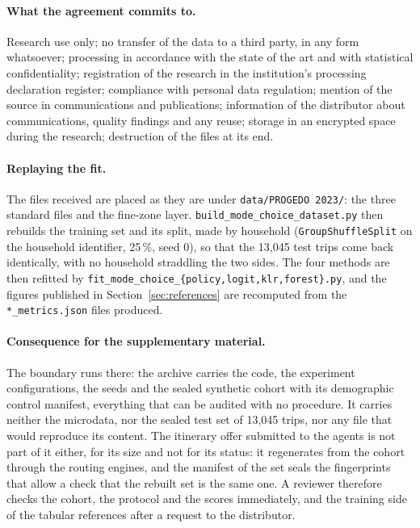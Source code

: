 \paragraph{What the agreement commits to.} Research use only; no transfer of the data to a third party, in any form whatsoever; processing in accordance with the state of the art and with statistical confidentiality; registration of the research in the institution's processing declaration register; compliance with personal data regulation; mention of the source in communications and publications; information of the distributor about communications, quality findings and any reuse; storage in an encrypted space during the research; destruction of the files at its end.

\paragraph{Replaying the fit.} The files received are placed as they are under \texttt{data/PROGEDO 2023/}: the three standard files and the fine-zone layer. \texttt{build\_mode\_choice\_dataset.py} then rebuilds the training set and its split, made by household (\texttt{GroupShuffleSplit} on the household identifier, 25\,\%, seed 0), so that the 13{,}045 test trips come back identically, with no household straddling the two sides. The four methods are then refitted by \texttt{fit\_mode\_choice\_\{policy,logit,klr,forest\}.py}, and the figures published in Section~\ref{sec:references} are recomputed from the \texttt{*\_metrics.json} files produced.

\paragraph{Consequence for the supplementary material.} The boundary runs there: the archive carries the code, the experiment configurations, the seeds and the sealed synthetic cohort with its demographic control manifest, everything that can be audited with no procedure. It carries neither the microdata, nor the sealed test set of 13{,}045 trips, nor any file that would reproduce its content. The itinerary offer submitted to the agents is not part of it either, for its size and not for its status: it regenerates from the cohort through the routing engines, and the manifest of the set seals the fingerprints that allow a check that the rebuilt set is the same one. A reviewer therefore checks the cohort, the protocol and the scores immediately, and the training side of the tabular references after a request to the distributor.

